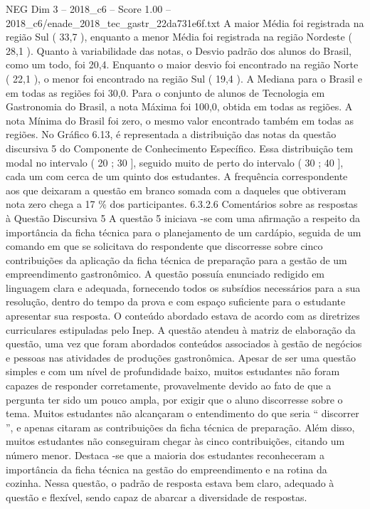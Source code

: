 \begin{textsample}{NEG Dim 3 – 2018\_c6 – Score 1.00 – 2018\_c6/enade\_2018\_tec\_gastr\_22da731e6f.txt}
A maior Média foi registrada na região Sul ( 33,7 ), enquanto a menor Média foi registrada na região Nordeste ( 28,1 ).
Quanto à variabilidade das notas, o Desvio padrão dos alunos do Brasil, como um todo, foi 20,4.
Enquanto o maior desvio foi encontrado na região Norte ( 22,1 ), o menor foi encontrado na região Sul ( 19,4 ).
A Mediana para o Brasil e em todas as regiões foi 30,0.
Para o conjunto de alunos de Tecnologia em Gastronomia do Brasil, a nota Máxima foi 100,0, obtida em todas as regiões.
A nota Mínima do Brasil foi zero, o mesmo valor encontrado também em todas as regiões.
No Gráfico 6.13, é representada a distribuição das notas da questão discursiva 5 do Componente de Conhecimento Específico.
Essa distribuição tem modal no intervalo ( 20 ; 30 ], seguido muito de perto do intervalo ( 30 ; 40 ], cada um com cerca de um quinto dos estudantes.
A frequência correspondente aos que deixaram a questão em branco somada com a daqueles que obtiveram nota zero chega a 17 \% dos participantes. 6.3.2.6 Comentários sobre as respostas à Questão Discursiva 5 A questão 5 iniciava -se com uma afirmação a respeito da importância da ficha técnica para o planejamento de um cardápio, seguida de um comando em que se solicitava do respondente que discorresse sobre cinco contribuições da aplicação da ficha técnica de preparação para a gestão de um empreendimento gastronômico.
A questão possuía enunciado redigido em linguagem clara e adequada, fornecendo todos os subsídios necessários para a sua resolução, dentro do tempo da prova e com espaço suficiente para o estudante apresentar sua resposta.
O conteúdo abordado estava de acordo com as diretrizes curriculares estipuladas pelo Inep.
A questão atendeu à matriz de elaboração da questão, uma vez que foram abordados conteúdos associados à gestão de negócios e pessoas nas atividades de produções gastronômica.
Apesar de ser uma questão simples e com um nível de profundidade baixo, muitos estudantes não foram capazes de responder corretamente, provavelmente devido ao fato de que a pergunta ter sido um pouco ampla, por exigir que o aluno discorresse sobre o tema.
Muitos estudantes não alcançaram o entendimento do que seria “ discorrer ”, e apenas citaram as contribuições da ficha técnica de preparação.
Além disso, muitos estudantes não conseguiram chegar às cinco contribuições, citando um número menor.
Destaca -se que a maioria dos estudantes reconheceram a importância da ficha técnica na gestão do empreendimento e na rotina da cozinha.
Nessa questão, o padrão de resposta estava bem claro, adequado à questão e flexível, sendo capaz de abarcar a diversidade de respostas.

\end{textsample}
